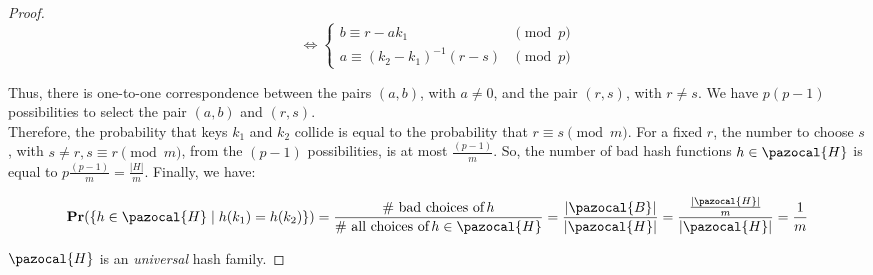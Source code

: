 \documentclass{article}
\newcommand{\Hb}{\pazocal{H}}
\newcommand{\Bb}{\pazocal{B}}
\begin{document}
\begin{proof}
\begin{equation*}
\iff
     \begin{cases}
        b \equiv r - ak_1 & \pmod p \\
        a \equiv (k_2 - k_1)^{-1} (r - s) & \pmod p
    \end{cases}
\end{equation*}



\noindent Thus, there is one-to-one correspondence between the pairs $(a, b)$, with $a \ne 0$, and the pair $(r, s)$, with $r \ne s$. We have $p(p - 1)$ possibilities to select the pair $(a, b)$ and $(r, s)$.\\

\noindent Therefore, the probability that keys $k_1$ and $k_2$ collide is equal to the probability that $r \equiv s \pmod m$. For a fixed $r$, the number to choose $s$, with $s \ne r, s \equiv r \pmod m$, from the $(p - 1)$ possibilities, is at most $\frac{(p - 1)}{m}$. 
So, the number of bad hash functions $h \in \Hb$ is equal to $p\frac{(p - 1)}{m} = \frac{|H|}{m}$. Finally, we have:

$$
\textrm{\textbf{Pr}}(\{h \in \Hb \mid h(k_1) = h(k_2) \}) = \frac{\text{\# bad choices of} \, h}{\text{\# all choices of} \, h \in \Hb} = \frac{|\Bb|}{|\Hb|} = \frac{\frac{|\Hb|}{m}}{|\Hb|} = \frac{1}{m}
$$ 

\noindent $\Hb$ is an \textit{universal} hash family.

\end{proof}
\end{document}
